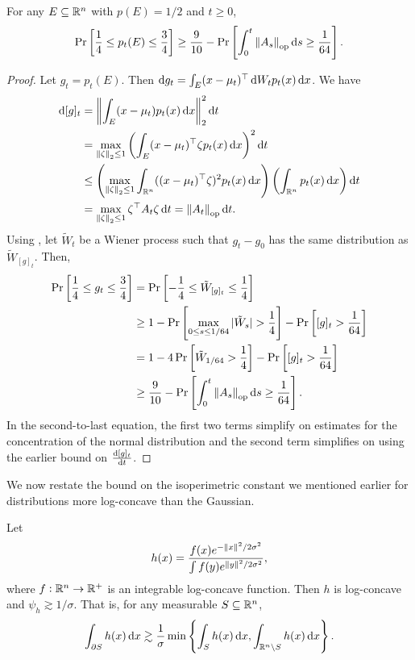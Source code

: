 \documentclass{article}
\begin{document}
		\begin{lemma}
			\label{basic estimate}
			For any $E\subseteq\mathbb{R}^n$ with $p(E) = 1/2$ and $t \geq 0$,
			\[ \Pr\left[\frac{1}{4} \leq p_t(E) \leq \frac{3}{4} \right] \geq \frac{9}{10} - \Pr\left[\int_0^t \left\lVert A_s\right\rVert_{\text{op}} \operatorname{d}\!{s} \geq \frac{1}{64}\right]. \]
		\end{lemma}
		\begin{proof}
			Let $g_t = p_t(E)$. Then $\operatorname{d}\!{g}_t = \int_E (x-\mu_t)^\top \operatorname{d}\!{W}_t p_t(x) \operatorname{d}\!{x}$. We have
			\begin{align*}
				\d{[g]_t} &= \norm{\int_E (x-\mu_t)p_t(x) \d{x}}_2^2 \d{t} \\
					&= \max_{\norm{\zeta}_2 \leq 1} \left(\int_E (x-\mu_t)^\top\zeta p_t(x) \d{x}\right)^2 \d{t} \\
					&\leq \left(\max_{\norm{\zeta}_2 \leq 1} \int_{\Rn} ((x-\mu_t)^\top\zeta)^2 p_t(x) \d{x}\right) \left(\int_{\Rn} p_t(x)\d{x}\right) \d{t} \\
					&= \max_{\norm{\zeta}_2 \leq 1} \zeta^\top A_t \zeta \d{t} = \opnorm{A_t}\d{t}.
			\end{align*}
			Using , let $\tilde{W}_t$ be a Wiener process such that $g_t - g_0$ has the same distribution as $\tilde{W}_{[g]_t}$. Then,
			\begin{align*}
				\Pr\left[\frac{1}{4} \leq g_t \leq \frac{3}{4}\right] &= \Pr\left[-\frac{1}{4} \leq \tilde{W}_{[g]_t} \leq \frac{1}{4}\right] \\
					&\geq 1 - \Pr\left[\max_{0 \leq s \leq 1/64} |\tilde{W}_s| > \frac{1}{4}\right] - \Pr\left[[g]_t > \frac{1}{64}\right] \\
					&= 1 - 4\Pr\left[\tilde{W}_{1/64} > \frac{1}{4}\right] - \Pr\left[[g]_t > \frac{1}{64}\right] \\
					&\geq \frac{9}{10} - \Pr\left[\int_0^t \left\lVert A_s\right\rVert_{\text{op}} \operatorname{d}\!{s} \geq \frac{1}{64}\right].
			\end{align*}
			In the second-to-last equation, the first two terms simplify on estimates for the concentration of the normal distribution and the second term simplifies on using the earlier bound on $\frac{\operatorname{d}\!{[g]_t}}{\operatorname{d}\!{t}}$.
		\end{proof}

		We now restate the bound on the isoperimetric constant we mentioned earlier for distributions more log-concave than the Gaussian.

		\begin{theorem}
			\label{kls for gaussian}
			Let
			\[ h(x) = \frac{f(x)e^{-\left\lVert x\right\rVert^2/2\sigma^2}}{\int f(y)e^{\left\lVert y\right\rVert^2/2\sigma^2}}, \]
			where $f:\mathbb{R}^n\to\mathbb{R}^+$ is an integrable log-concave function. Then $h$ is log-concave and $\psi_h \gtrsim 1/\sigma$. That is, for any measurable $S\subseteq\mathbb{R}^n$,
			\[ \int_{\partial S} h(x)\operatorname{d}\!{x} \gtrsim \frac{1}{\sigma} \min\left\{\int_S h(x)\operatorname{d}\!{x}, \int_{\mathbb{R}^n\setminus S}h(x)\operatorname{d}\!{x}\right\}. \]
		\end{theorem}
\end{document}
